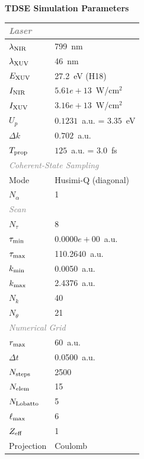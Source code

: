 \documentclass[11pt]{article}
\begin{document}

\begin{center}
  \Large\textbf{TDSE Simulation Parameters}
\end{center}
\vspace{4pt}

\begin{tabular}{@{}ll@{}}
  \toprule
  \multicolumn{2}{l}{\small\textit{\textcolor{gray}{Laser}}} \\
  \hline
  $\lambda_{\rm NIR}$ & 799~nm \\
  $\lambda_{\rm XUV}$ & 46~nm \\
  $E_{\rm XUV}$ & 27.2~eV (H18) \\
  $I_{\rm NIR}$ & $5.61e+13$~W/cm$^2$ \\
  $I_{\rm XUV}$ & $3.16e+13$~W/cm$^2$ \\
  $U_p$ & $0.1231$~a.u. = $3.35$~eV \\
  $\Delta k$ & $0.702$~a.u. \\
  $T_{\rm prop}$ & $125$~a.u. = $3.0$~fs \\
  \multicolumn{2}{l}{\small\textit{\textcolor{gray}{Coherent-State Sampling}}} \\
  \hline
  Mode & Husimi-Q (diagonal) \\
  $N_{\alpha}$ & 1 \\
  \multicolumn{2}{l}{\small\textit{\textcolor{gray}{Scan}}} \\
  \hline
  $N_{\tau}$ & 8 \\
  $\tau_{\rm min}$ & $0.0000e+00$~a.u. \\
  $\tau_{\rm max}$ & 110.2640~a.u. \\
  $k_{\rm min}$ & 0.0050~a.u. \\
  $k_{\rm max}$ & 2.4376~a.u. \\
  $N_k$ & 40 \\
  $N_{\theta}$ & 21 \\
  \multicolumn{2}{l}{\small\textit{\textcolor{gray}{Numerical Grid}}} \\
  \hline
  $r_{\rm max}$ & 60~a.u. \\
  $\Delta t$ & 0.0500~a.u. \\
  $N_{\rm steps}$ & 2500 \\
  $N_{\rm elem}$ & 15 \\
  $N_{\rm Lobatto}$ & 5 \\
  $\ell_{\rm max}$ & 6 \\
  $Z_{\rm eff}$ & 1 \\
  Projection & Coulomb \\
  \bottomrule
\end{tabular}
\end{document}
